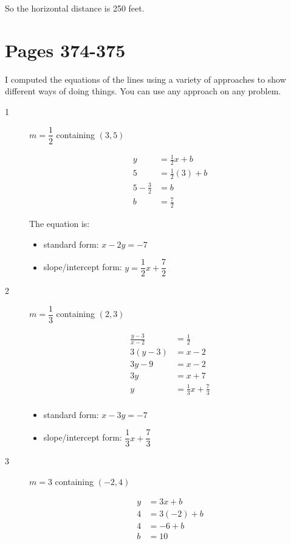 \documentclass[fleqn,addpoints]{exam}
\begin{document}
\begin{description}
So the horizontal distance is 250 feet.
 
\end{description}

\section{Pages 374-375}

I computed the equations of the lines using a variety of approaches to show different ways of doing things.  You can use
any approach on any problem.

\begin{description}

\item[1]
$m=\dfrac{1}{2}$ containing $(3, 5)$

\begin{align*}
  y &= \frac{1}{2} x + b \\
  5 &= \frac{1}{2} (3) + b \\
  5 - \frac{3}{2} &= b \\
  b &= \frac{7}{2}
\end{align*}

The equation is:
\begin{itemize}
  \item standard form: $x-2y = -7$
  \item slope/intercept form: $y = \dfrac{1}{2} x + \dfrac{7}{2}$
\end{itemize}

\item[2]
$m = \dfrac{1}{3}$ containing $(2, 3)$

\begin{align*}
  \frac{y-3}{x-2} &= \frac{1}{2} \\
  3(y-3) &= x-2 \\
  3y-9 &= x-2 \\
  3y &= x+7 \\
  y &= \frac{1}{3} x + \frac{7}{3} \\
\end{align*}

\begin{itemize}
  \item standard form: $x-3y=-7$
  \item slope/intercept form: $\dfrac{1}{3} x + \dfrac{7}{3}$
\end{itemize}

\item[3]
$m = 3$ containing $(-2, 4)$

\begin{align*}
  y &= 3x + b \\
  4 &= 3(-2) + b \\
  4 &= -6 + b \\
  b &= 10 \\
\end{align*}


\end{description}
\end{document}
